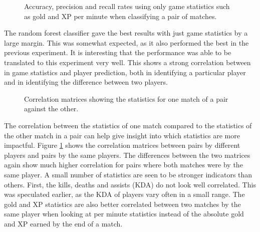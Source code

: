\documentclass[Report.tex]{subfiles}
\newcommand{\baraxis}[8]{
\begin{axis}[
    ybar,
    title={#1},
    width=#5,
    height=#6,
    ymin=#3, ymax=#4,
    bar width=1em,
    legend style={at={#7},anchor=north,legend columns=-1},
    enlarge x limits=0.4,
    x tick label style={align=center,text width=#8},
    symbolic x coords={Logistic Regression, Random Forest, Multi-layer Perceptron},
    xtick=data,
    ylabel={#2}
]
}
\newcommand{\plotbar}[5]{
\addplot+[
	discard if not={numSplits}{#1},
	discard if not={split}{#2},
	discard if not={features}{#3},
] table [x=model, y=#4,col sep=comma] {data/19-pair-cv.csv};
\addlegendentry{#5}
}
\begin{document}
\begin{figure}[H]
\centering
{}
\caption{Accuracy, precision and recall rates using only game statistics such as gold and XP per minute when classifying a pair of matches.}
\end{figure}

The random forest classifier gave the best results with just game statistics by a large margin. This was somewhat expected, as it also performed the best in the previous experiment. It is interesting that the performance was able to be translated to this experiment very well. This shows a strong correlation between in game statistics and player prediction, both in identifying a particular player and in identifying the difference between two players. 

\begin{figure}[H]
\vspace{-2cm}
\begin{subfigure}{1\textwidth}
\end{subfigure}

\begin{subfigure}{1\textwidth}
\end{subfigure}
\caption{Correlation matrices showing the statistics for one match of a pair against the other.}
\label{fig:stats-correlation}
\end{figure}

The correlation between the statistics of one match compared to the statistics of the other match in a pair can help give insight into which statistics are more impactful. Figure \ref{fig:stats-correlation} shows the correlation matrices between pairs by different players and pairs by the same players. The differences between the two matrices again show much higher correlation for pairs where both matches were by the same player. A small number of statistics are seen to be stronger indicators than others. First, the kills, deaths and assists (KDA) do not look well correlated. This was speculated earlier, as the KDA of players vary often in a small range. The gold and XP statistics are also better correlated between two matches by the same player when looking at per minute statistics instead of the absolute gold and XP earned by the end of a match. 
\end{document}
